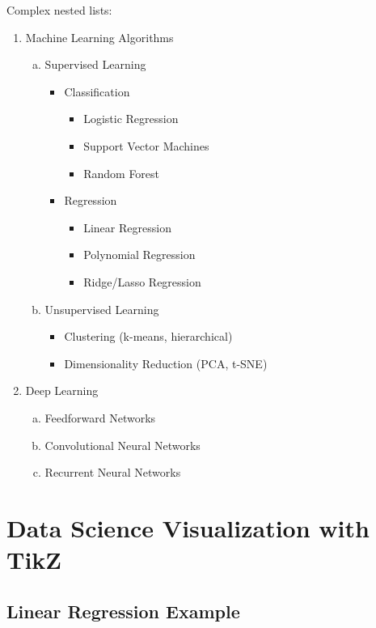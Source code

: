\documentclass[12pt,a4paper,twoside]{article}
\theoremstyle{definition}
\begin{document}
Complex nested lists:
\begin{enumerate}
\item Machine Learning Algorithms
    \begin{enumerate}[(a)]
    \item Supervised Learning
        \begin{itemize}
        \item Classification
            \begin{itemize}
            \item Logistic Regression
            \item Support Vector Machines
            \item Random Forest
            \end{itemize}
        \item Regression
            \begin{itemize}
            \item Linear Regression
            \item Polynomial Regression
            \item Ridge/Lasso Regression
            \end{itemize}
        \end{itemize}
    \item Unsupervised Learning
        \begin{itemize}
        \item Clustering (k-means, hierarchical)
        \item Dimensionality Reduction (PCA, t-SNE)
        \end{itemize}
    \end{enumerate}
\item Deep Learning
    \begin{enumerate}[(a)]
    \item Feedforward Networks
    \item Convolutional Neural Networks
    \item Recurrent Neural Networks
    \end{enumerate}
\end{enumerate}

\section{Data Science Visualization with TikZ}

\subsection{Linear Regression Example}
\end{document}

